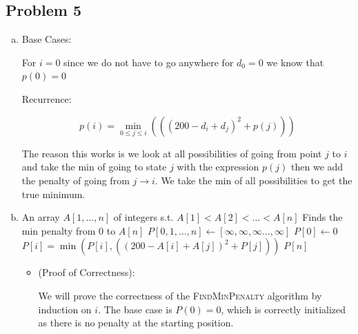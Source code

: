 \documentclass[12pt, letterpaper]{article}
\theoremstyle{definition}
\begin{document}
\newpage
\subsection*{Problem 5}
\begin{enumerate}[(a)]
    \item Base Cases:
    
    For $i=0$ since we do not have to go anywhere for $d_0=0$ we know that $p(0)=0$

    Recurrence:

    \[p(i) =\min_{0 \leq j \leq i}(((200-d_i+d_j)^2+p(j)))\]

    The reason this works is we look at all possibilities of going from point $j$ to $i$ and take the min of going to state $j$ with the expression $p(j)$ then we add the penalty of going from $j \to i$. We take the min of all possibilities to get the true minimum.

    \item \begin{algorithm}[H]
        \caption{Find min penalty from $0$ to $n$}
        \begin{algorithmic}[1]
        \Require An array $A[1,\dots,n]$ of integers s.t. $A[1] < A[2] <\dots < A[n]$
        \Ensure Finds the min penalty from $0$ to $A[n]$
                \State {}
            \EndIf
            \State $P[0,1,\dots,n] \gets [\infty,\infty,\infty\dots,\infty]$ 
            \State $P[0] \gets 0$ 
             
                 
                    \State $P[i]=\min(P[i],((200-A[i]+A[j])^2+P[j]))$
                \EndFor
            \EndFor
        \EndFunction
        \Return $P[n]$ 
        \end{algorithmic}
        \end{algorithm}

    \begin{itemize}
        \item (Proof of Correctness):
        
        We will prove the correctness of the \textsc{FindMinPenalty} algorithm by induction on $i$. The base case is $P(0) = 0$, which is correctly initialized as there is no penalty at the starting position. 


\end{itemize}
\end{enumerate}
\end{document}
